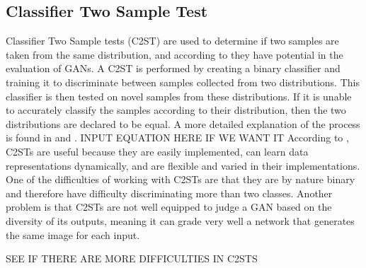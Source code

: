 \subsection{Classifier Two Sample Test}
\label{sub:classifier_two_sample_test}

Classifier Two Sample tests (C2ST) \cite{borji2018pros} are used to determine if two samples are taken from the same distribution, and according to \cite{2016arXiv161006545L} they have potential in the evaluation of GANs.
A C2ST is performed by creating a binary classifier and training it to discriminate between samples collected from two distributions.
This classifier is then tested on novel samples from these distributions.
If it is unable to accurately classify the samples according to their distribution, then the two distributions are declared to be equal.
A more detailed explanation of the process is found in \cite{borji2018pros} and \cite{2016arXiv161006545L}.
INPUT EQUATION HERE IF WE WANT IT
According to \cite{2016arXiv161006545L}, C2STs are useful because they are easily implemented, can learn data representations dynamically, and are flexible and varied in their implementations.
One of the difficulties of working with C2STs are that they are by nature binary and therefore have difficulty discriminating more than two classes.
Another problem is that C2STs are not well equipped to judge a GAN based on the diversity of its outputs, meaning it can grade very well a network that generates the same image for each input.

SEE IF THERE ARE MORE DIFFICULTIES IN C2STS
